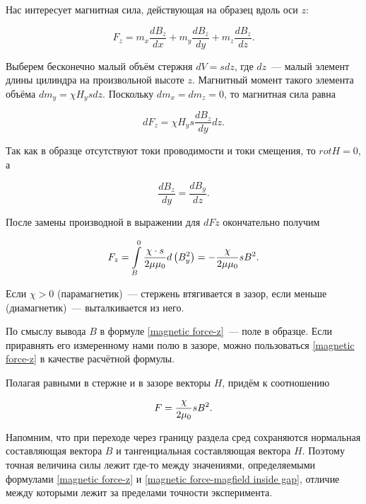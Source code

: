 Нас интересует магнитная сила, действующая на образец вдоль оси $z$:

\begin{equation*}
	F_z = m_x \frac{dB_z}{dx} + m_y \frac{dB_z}{dy} + m_z \frac{dB_z}{dz}.
\end{equation*}

Выберем бесконечно малый объём стержня $dV = sdz$, где $dz$~--- малый элемент длины цилиндра на произвольной высоте $z$. Магнитный момент такого элемента объёма $dm_y = \chi H_y s dz$. Поскольку $dm_x = dm_z = 0$, то магнитная сила равна

\begin{equation*}
	dF_z = \chi H_y s \frac{dB_z}{dy} dz.
\end{equation*}

Так как в образце отсутствуют токи проводимости и токи смещения, то $rot H = 0$, а

\begin{equation*}
	\frac{dB_z}{dy} = \frac{dB_y}{dz}.
\end{equation*}

После замены производной в выражении для $dFz$ окончательно получим

\begin{equation}
	\eqmark{magnetic force-z}
	F_z = \int\limits_B^0 \frac{\chi\cdot s}{2\mu \mu_0}d\left( B_y^2 \right) = - \frac{\chi}{2\mu \mu_0} sB^2.
\end{equation}

Если $\chi > 0$ (парамагнетик)~--- стержень втягивается в зазор, если меньше (диамагнетик)~--- выталкивается из него.

По смыслу вывода $B$ в формуле \eqref{magnetic force-z}~--- поле в образце. Если приравнять его измеренному нами полю в зазоре, можно пользоваться \eqref{magnetic force-z} в качестве расчётной формулы.

Полагая равными в стержне и в зазоре векторы $H$, придём к соотношению

\begin{equation}
	\eqmark{magnetic force-magfield inside gap}
	F = \frac{\chi}{2\mu_0} sB^2.
\end{equation}

Напомним, что при переходе через границу раздела сред сохраняются нормальная составляющая вектора $B$ и тангенциальная составляющая вектора $H$. Поэтому точная величина силы лежит где-то между значениями, определяемыми формулами \eqref{magnetic force-z} и \eqref{magnetic force-magfield inside gap}, отличие между которыми лежит за пределами точности эксперимента.

